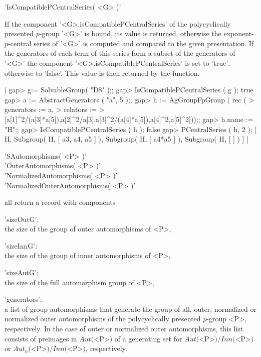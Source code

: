 
'IsCompatiblePCentralSeries( <G> )'

If the component '<G>.isCompatiblePCentralSeries' of the polycyclically 
presented $p$-group '<G>' is bound, its value is 
returned, otherwise the exponent-$p$-central series of '<G>' is computed 
and compared to the given presentation. If the generators of each term of 
this series form a subset of the generators of '<G>' the component 
'<G>.isCompatiblePCentralSeries' is set to 'true', otherwise to 'false'. 
This value is then returned by the function. 

|    gap> g:= SolvableGroup( "D8" );;
    gap> IsCompatiblePCentralSeries ( g );
    true
    gap> a := AbstractGenerators ( "a", 5 );;
    gap> h := AgGroupFpGroup ( rec (
    > generators := a,
    > relators := 
    > [a[1]^2/(a[3]*a[5]),a[2]^2/a[3],a[3]^2/(a[4]*a[5]),a[4]^2,a[5]^2]));;
    gap> h.name := "H";;
    gap> IsCompatiblePCentralSeries ( h );
    false
    gap> PCentralSeries ( h, 2 );
    [ H, Subgroup( H, [ a3, a4, a5 ] ), Subgroup( H, [ a4*a5 ] ), 
      Subgroup( H, [  ] ) ] |

%
%

'SAutomorphisms( <P> )'\\
'OuterAutomorphisms( <P> )'\\
'NormalizedAutomorphisms( <P> )'\\
'NormalizedOuterAutomorphisms( <P> )'

all return a record with components

'sizeOutG':\\     the size of the group of outer automorphisms of <P>,

'sizeInnG':\\     the size of the group of inner automorphisms of <P>,

'sizeAutG':\\     the size of the full automorphism group of <P>,

'generators':\\   a list of group automorphisms that
                  generate the group of all, outer,
                  normalized or normalized outer automorphisms of the
                  polycyclically presented $p$-group <P>, respectively.
                  In the case of outer or normalized outer automorphisms,
                  this list consists of preimages in $Aut($<P>$)$ of a
                  generating set for $Aut($<P>$)/Inn($<P>$)$ or
                  $Aut_n($<P>$)/Inn($<P>$)$, respectively.

